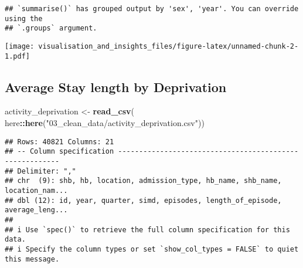 \documentclass[
]{article}
\newenvironment{Shaded}{\begin{snugshade}}{\end{snugshade}}
\newcommand{\FunctionTok}[1]{\textcolor[rgb]{0.13,0.29,0.53}{\textbf{#1}}}
\newcommand{\NormalTok}[1]{#1}
\newcommand{\OtherTok}[1]{\textcolor[rgb]{0.56,0.35,0.01}{#1}}
\newcommand{\SpecialCharTok}[1]{\textcolor[rgb]{0.81,0.36,0.00}{\textbf{#1}}}
\newcommand{\StringTok}[1]{\textcolor[rgb]{0.31,0.60,0.02}{#1}}
\begin{document}
\begin{verbatim}
## `summarise()` has grouped output by 'sex', 'year'. You can override using the
## `.groups` argument.
\end{verbatim}

\texttt{[image: visualisation\_and\_insights\_files/figure-latex/unnamed-chunk-2-1.pdf]}

\hypertarget{average-stay-length-by-deprivation}{%
\subsection{Average Stay length by
Deprivation}\label{average-stay-length-by-deprivation}}

\begin{Shaded}
\begin{Highlighting}[]
\NormalTok{activity\_deprivation }\OtherTok{\textless{}{-}} \FunctionTok{read\_csv}\NormalTok{(}
\NormalTok{  here}\SpecialCharTok{::}\FunctionTok{here}\NormalTok{(}\StringTok{"03\_clean\_data/activity\_deprivation.csv"}\NormalTok{))}
\end{Highlighting}
\end{Shaded}

\begin{verbatim}
## Rows: 40821 Columns: 21
## -- Column specification --------------------------------------------------------
## Delimiter: ","
## chr  (9): shb, hb, location, admission_type, hb_name, shb_name, location_nam...
## dbl (12): id, year, quarter, simd, episodes, length_of_episode, average_leng...
## 
## i Use `spec()` to retrieve the full column specification for this data.
## i Specify the column types or set `show_col_types = FALSE` to quiet this message.
\end{verbatim}
\end{document}
